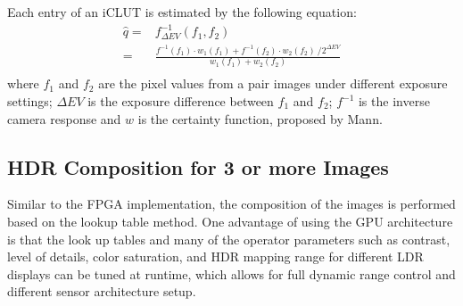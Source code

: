 Each entry of an iCLUT is estimated by the following equation: 
\begin{equation}\label{joint_est_2}
\begin{split}
  \hat{q}=&f^{-1}_{\Delta EV}(f_1, f_2) \\
  =&\frac{f^{-1}(f_1) \cdot w_1(f_1)+f^{-1}(f_2) \cdot w_2(f_2) \
      / 2^{\Delta EV}}{w_1(f_1)+w_2(f_2)}\\
\end{split}
\end{equation} 
where $f_1$ and $f_2$ are the pixel values from a pair images under different exposure settings; $
\Delta EV$ is the exposure difference between $f_1$ and $f_2$; $f^{-1}$ is the inverse camera 
response and $w$ is the certainty function, proposed by Mann\cite{mannist}.



\subsection{HDR Composition for 3 or more Images} \label{comp3_set_2} 
Similar to the FPGA implementation, the composition of the images is performed based on the lookup 
table method. One advantage of using the GPU architecture is that the look up tables and many of 
the operator parameters such as contrast, level of details, color saturation, and HDR mapping range 
for different LDR displays can be tuned at runtime, which allows for full dynamic range control and 
different sensor architecture setup. 

